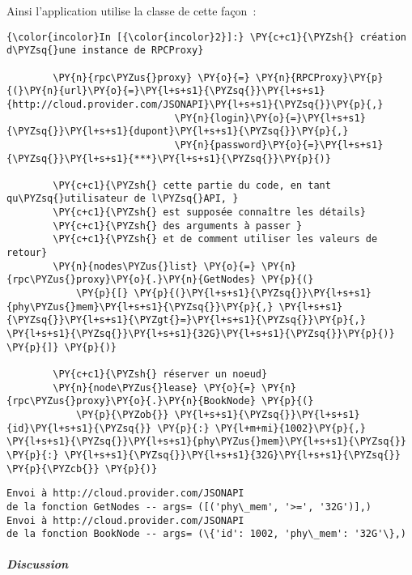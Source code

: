     Ainsi l'application utilise la classe de cette façon~:

    \begin{Verbatim}[commandchars=\\\{\}]
{\color{incolor}In [{\color{incolor}2}]:} \PY{c+c1}{\PYZsh{} création d\PYZsq{}une instance de RPCProxy}
        
        \PY{n}{rpc\PYZus{}proxy} \PY{o}{=} \PY{n}{RPCProxy}\PY{p}{(}\PY{n}{url}\PY{o}{=}\PY{l+s+s1}{\PYZsq{}}\PY{l+s+s1}{http://cloud.provider.com/JSONAPI}\PY{l+s+s1}{\PYZsq{}}\PY{p}{,} 
                             \PY{n}{login}\PY{o}{=}\PY{l+s+s1}{\PYZsq{}}\PY{l+s+s1}{dupont}\PY{l+s+s1}{\PYZsq{}}\PY{p}{,}
                             \PY{n}{password}\PY{o}{=}\PY{l+s+s1}{\PYZsq{}}\PY{l+s+s1}{***}\PY{l+s+s1}{\PYZsq{}}\PY{p}{)}
        
        \PY{c+c1}{\PYZsh{} cette partie du code, en tant qu\PYZsq{}utilisateur de l\PYZsq{}API, }
        \PY{c+c1}{\PYZsh{} est supposée connaître les détails}
        \PY{c+c1}{\PYZsh{} des arguments à passer }
        \PY{c+c1}{\PYZsh{} et de comment utiliser les valeurs de retour}
        \PY{n}{nodes\PYZus{}list} \PY{o}{=} \PY{n}{rpc\PYZus{}proxy}\PY{o}{.}\PY{n}{GetNodes} \PY{p}{(} 
            \PY{p}{[} \PY{p}{(}\PY{l+s+s1}{\PYZsq{}}\PY{l+s+s1}{phy\PYZus{}mem}\PY{l+s+s1}{\PYZsq{}}\PY{p}{,} \PY{l+s+s1}{\PYZsq{}}\PY{l+s+s1}{\PYZgt{}=}\PY{l+s+s1}{\PYZsq{}}\PY{p}{,} \PY{l+s+s1}{\PYZsq{}}\PY{l+s+s1}{32G}\PY{l+s+s1}{\PYZsq{}}\PY{p}{)} \PY{p}{]} \PY{p}{)}
        
        \PY{c+c1}{\PYZsh{} réserver un noeud}
        \PY{n}{node\PYZus{}lease} \PY{o}{=} \PY{n}{rpc\PYZus{}proxy}\PY{o}{.}\PY{n}{BookNode} \PY{p}{(}
            \PY{p}{\PYZob{}} \PY{l+s+s1}{\PYZsq{}}\PY{l+s+s1}{id}\PY{l+s+s1}{\PYZsq{}} \PY{p}{:} \PY{l+m+mi}{1002}\PY{p}{,} \PY{l+s+s1}{\PYZsq{}}\PY{l+s+s1}{phy\PYZus{}mem}\PY{l+s+s1}{\PYZsq{}} \PY{p}{:} \PY{l+s+s1}{\PYZsq{}}\PY{l+s+s1}{32G}\PY{l+s+s1}{\PYZsq{}} \PY{p}{\PYZcb{}} \PY{p}{)}
\end{Verbatim}


    \begin{Verbatim}[commandchars=\\\{\}]
Envoi à http://cloud.provider.com/JSONAPI
de la fonction GetNodes -- args= ([('phy\_mem', '>=', '32G')],)
Envoi à http://cloud.provider.com/JSONAPI
de la fonction BookNode -- args= (\{'id': 1002, 'phy\_mem': '32G'\},)

    \end{Verbatim}

    \hypertarget{discussion}{%
\subparagraph{Discussion}\label{discussion}}

